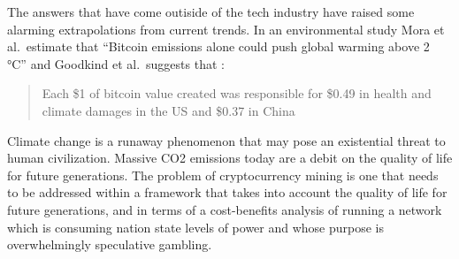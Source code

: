 The answers that have come outiside of the tech industry have raised some
alarming extrapolations from current trends.  In an environmental study Mora et
al.~estimate that ``Bitcoin emissions alone could push global warming above 2
°C'' \cite{mora2018bitcoin} and Goodkind et al.~suggests that
\cite{goodkind2020cryptodamages}:

\begin{quote}
Each \$1 of bitcoin value created was
responsible for \$0.49 in health and climate damages in the US and
\$0.37 in China
\end{quote}

Climate change is a runaway phenomenon that may pose an existential threat to
human civilization. Massive CO2 emissions today are a debit on the quality of
life for future generations. The problem of cryptocurrency mining is one that
needs to be addressed within a framework that takes into account the quality of
life for future generations, and in terms of a cost-benefits analysis of running
a network which is consuming nation state levels of power and whose purpose is
overwhelmingly speculative gambling.
